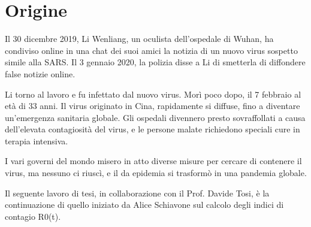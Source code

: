 \setlength{\parskip}{1em}
\section{Origine}
Il 30 dicembre 2019, Li Wenliang, un oculista dell’ospedale di Wuhan, ha condiviso online in una chat dei suoi amici la notizia di un nuovo virus sospetto simile alla SARS.
Il 3 gennaio 2020, la polizia disse a Li di smetterla di diffondere false notizie online.

\noindent Li torno al lavoro e fu infettato dal nuovo virus.
Morì poco dopo, il 7 febbraio al età di 33 anni.
Il virus originato in Cina, rapidamente si diffuse, fino a diventare un'emergenza sanitaria globale. Gli ospedali divennero presto sovraffollati a causa dell’elevata contagiosità del virus, e le persone malate richiedono speciali cure in terapia intensiva.

\noindent I vari governi del mondo misero in atto diverse misure per cercare di contenere il virus, ma nessuno ci riuscì, e il da epidemia si trasformò in una pandemia globale.


\noindent Il seguente lavoro di tesi, in collaborazione con il Prof. Davide Tosi,  è la continuazione di quello iniziato da Alice Schiavone sul calcolo degli indici di contagio R0(t).